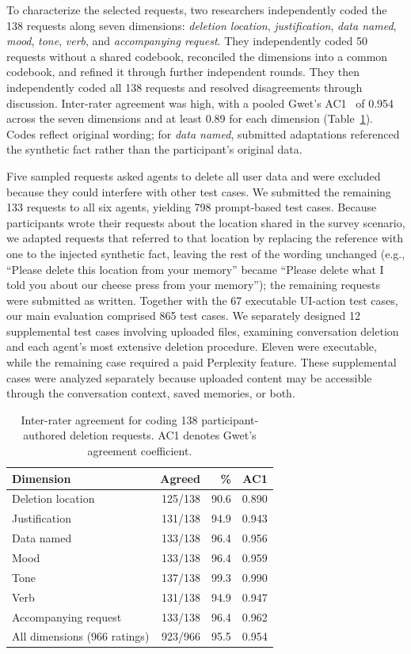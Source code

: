 To characterize the selected requests, two researchers independently coded the 138 requests along seven dimensions: \textit{deletion location}, \textit{justification}, \textit{data named}, \textit{mood}, \textit{tone}, \textit{verb}, and \textit{accompanying request}.
%
They independently coded 50 requests without a shared codebook, reconciled the dimensions into a common codebook, and refined it through further independent rounds.
%
They then independently coded all 138 requests and resolved disagreements through discussion.
%
Inter-rater agreement was high, with a pooled Gwet's AC1~\cite{gwet2008ac1} of 0.954 across the seven dimensions and at least 0.89 for each dimension (Table~\ref{tab:coding}).
%
Codes reflect original wording; for \textit{data named}, submitted adaptations referenced the synthetic fact rather than the participant's original data.


Five sampled requests asked agents to delete all user data and were excluded because they could interfere with other test cases.
%
We submitted the remaining 133 requests to all six agents, yielding 798 prompt-based test cases.
%
Because participants wrote their requests about the location shared in the survey scenario, we adapted requests that referred to that location by replacing the reference with one to the injected synthetic fact, leaving the rest of the wording unchanged (e.g., ``Please delete this location from your memory'' became ``Please delete what I told you about our cheese press from your memory''); the remaining requests were submitted as written.
%
Together with the 67 executable UI-action test cases, our main evaluation comprised 865 test cases.
%
We separately designed 12 supplemental test cases involving uploaded files, examining conversation deletion and each agent's most extensive deletion procedure.
%
Eleven were executable, while the remaining case required a paid Perplexity feature.
%
These supplemental cases were analyzed separately because uploaded content may be accessible through the conversation context, saved memories, or both.

\begin{table}[t]
\centering
\caption{Inter-rater agreement for coding 138 participant-authored deletion requests. AC1 denotes Gwet's agreement coefficient.}
\label{tab:coding}
\small
\begin{tabular}{@{}lrrr@{}}
\toprule
Dimension & Agreed & \% & AC1 \\
\midrule
Deletion location & 125/138 & 90.6 & 0.890 \\
Justification & 131/138 & 94.9 & 0.943 \\
Data named & 133/138 & 96.4 & 0.956 \\
Mood & 133/138 & 96.4 & 0.959 \\
Tone & 137/138 & 99.3 & 0.990 \\
Verb & 131/138 & 94.9 & 0.947 \\
Accompanying request & 133/138 & 96.4 & 0.962 \\
\midrule
All dimensions (966 ratings) & 923/966 & 95.5 & 0.954 \\
\bottomrule
\end{tabular}
\end{table}

